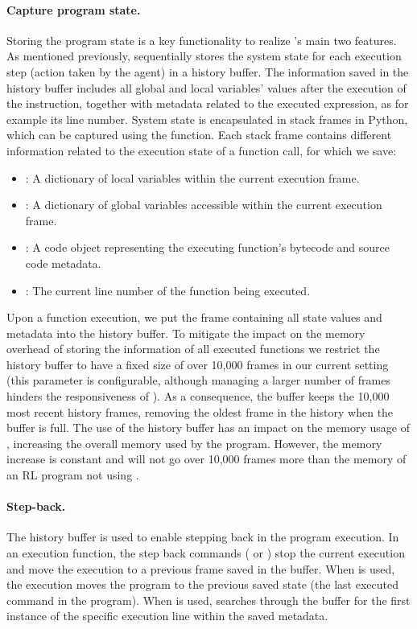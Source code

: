 \paragraph{Capture program state.}
Storing the program state is a key functionality to realize \flik's main two features. As mentioned 
previously, \flik sequentially stores the system state for each execution step (\ie action taken by the 
agent) in a history buffer. 
The information saved in the history buffer includes all global and local variables' values after the 
execution of the instruction, together with metadata related to the executed expression, as for 
example its line number. System state is encapsulated in stack frames in Python, which can be 
captured using the  function. Each stack frame contains different information 
related to the execution state of a function call, for which we save:
\begin{itemize}
    \item {}: A dictionary of local variables within the current execution frame.
    \item {}: A dictionary of global variables accessible within the current execution frame.
    \item {}: A code object representing the executing function's bytecode and source code metadata.
    \item {}: The current line number of the function being executed.
\end{itemize}

Upon a function execution, we put the frame containing all state values and metadata into the history 
buffer. To mitigate the impact on the memory overhead of storing the information of all executed 
functions we restrict the history buffer to have a fixed size of over 10,000 frames in our current setting 
(this parameter is configurable, although managing a larger number of frames hinders the 
responsiveness of \flik). As a consequence, the buffer keeps the 10,000 most recent 
history frames, removing the oldest frame in the history when the buffer is full.
The use of the history buffer has an impact on the memory usage of \flik, increasing the overall 
memory used by the program. However, the memory increase is constant and will not go over 10,000 
frames more than the memory of an \ac{RL} program not using \flik.

\paragraph{Step-back.}    
The history buffer is used to enable stepping back in the program execution. In an execution function, 
the step back commands ( or ) stop the current execution and move 
the execution to a previous frame saved in the buffer. 
When  is used, the execution moves the program to the previous saved state (\ie the 
last executed command in the program).  When  is used, \flik searches through the 
buffer for the first instance of the specific execution line within the saved metadata.

